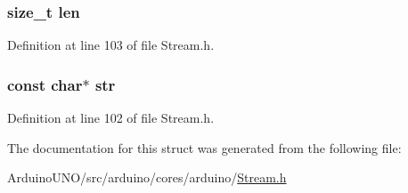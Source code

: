 \subsubsection[{len}]{\setlength{\rightskip}{0pt plus 5cm}size\+\_\+t len}\label{struct_stream_1_1_multi_target_a7360b55975153b822efc5217b7734e6a}


Definition at line 103 of file Stream.\+h.

\hypertarget{struct_stream_1_1_multi_target_af25d6dc49269fa2003ac7c7fa6f13915}{}
\subsubsection[{str}]{\setlength{\rightskip}{0pt plus 5cm}const char$\ast$ str}\label{struct_stream_1_1_multi_target_af25d6dc49269fa2003ac7c7fa6f13915}


Definition at line 102 of file Stream.\+h.



The documentation for this struct was generated from the following file\+:\begin{DoxyCompactItemize}
\item 
Arduino\+U\+N\+O/src/arduino/cores/arduino/\hyperlink{_stream_8h}{Stream.\+h}\end{DoxyCompactItemize}
